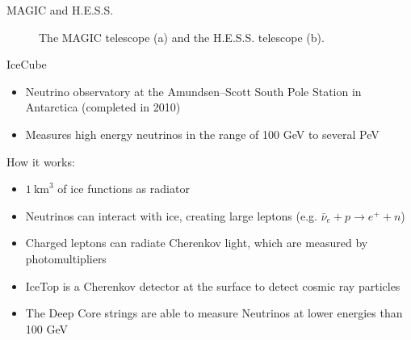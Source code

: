 \documentclass[aspectratio=1610, 10pt]{beamer}
\begin{document}
\begin{frame}{MAGIC and H.E.S.S.}
  \begin{figure}
      \hspace{0.5cm}
  \caption{ The MAGIC telescope (a) and the H.E.S.S. telescope (b).}
  \end{figure}
\end{frame}


\begin{frame}{IceCube}
  \begin{itemize}
    \item Neutrino observatory at the Amundsen–Scott South Pole Station in Antarctica (completed in 2010)
    \medskip
    \item Measures high energy neutrinos in the range of 100 GeV to several PeV
  \end{itemize}
\vspace{0.5cm}
  How it works:
  \begin{itemize}
    \item $1 \: \mathrm{km}^3$ of ice functions as radiator
    \medskip
    \item Neutrinos can interact with ice, creating large leptons (e.g. $\bar{\nu}_e + p \rightarrow e^{+} + n$)
    \medskip
    \item Charged leptons can radiate Cherenkov light, which are measured by photomultipliers
    \medskip
    \item IceTop is a Cherenkov detector at the surface to detect cosmic ray particles
    \medskip
    \item The Deep Core strings are able to measure Neutrinos at lower energies than 100 GeV
  \end{itemize}
\end{frame}
\end{document}
